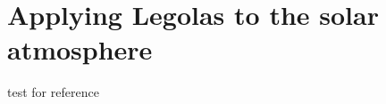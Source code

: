 \chapter{Applying Legolas to the solar atmosphere} \label{ch: legolas_applications}

test for reference \cite{book_MHD}


\cleardoublepage

